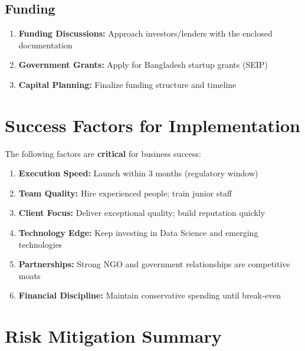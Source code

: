 \subsection{Funding}

\begin{enumerate}
    \item [\checkmark] \textbf{Funding Discussions:} Approach investors/lenders with the enclosed documentation
    \item [\checkmark] \textbf{Government Grants:} Apply for Bangladesh startup grants (SEIP)
    \item [\checkmark] \textbf{Capital Planning:} Finalize funding structure and timeline
\end{enumerate}

\section{Success Factors for Implementation}

\begin{importantbox}
    The following factors are \textbf{critical} for business success:

    \begin{enumerate}
        \item \textbf{Execution Speed:} Launch within 3 months (regulatory window)
        \item \textbf{Team Quality:} Hire experienced people; train junior staff
        \item \textbf{Client Focus:} Deliver exceptional quality; build reputation quickly
        \item \textbf{Technology Edge:} Keep investing in Data Science and emerging technologies
        \item \textbf{Partnerships:} Strong NGO and government relationships are competitive moats
        \item \textbf{Financial Discipline:} Maintain conservative spending until break-even
    \end{enumerate}
\end{importantbox}

\section{Risk Mitigation Summary}


